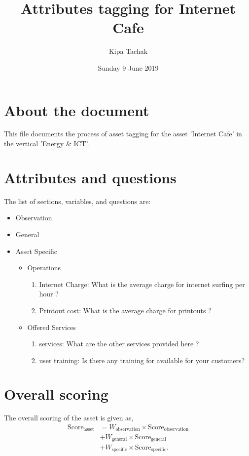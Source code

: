 \documentclass[oneside,twocolumn]{article}
\title{Attributes tagging for Internet Cafe}
\author{Kipa Tachak}
\date{Sunday  9 June 2019}
\newcommand{\tsub}[2]{\text{#1}_{\text{#2}}}
\newcommand{\tsubb}[2]{#1_{\text{#2}}}
\begin{document}
\maketitle

\section{About the document}
This file documents the process of asset tagging for the asset 'Internet Cafe' in the
vertical 'Energy \& ICT'.

\section{Attributes and questions}
The list of sections, variables, and questions are:
    \begin{itemize}
    \item Observation
    \item General
    \item Asset Specific
    \begin{itemize}
\item Operations
\begin{enumerate}
\item Internet Charge: What is the average charge for internet surfing per hour ?
\item Printout cost: What is the average charge for printouts ?
\end{enumerate}

\item Offered Services
\begin{enumerate}
\item services: What are the other services provided here ?
\item user training: Is there any training for available for your customers?
\end{enumerate}

\end{itemize}

    \end{itemize}
\section{Overall scoring}
The overall scoring of the asset is given as,
\begin{align*}
	\tsub{Score}{asset} &= \tsubb{W}{observation} \times \tsub{Score}{observation} \\
	&+ \tsubb{W}{general} \times \tsub{Score}{general} \\
	&+ \tsubb{W}{specific} \times \tsub{Score}{specific}.
\end{align*}
\end{document}
